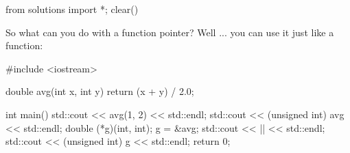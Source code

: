 \begin{python0}
from solutions import *; clear()
\end{python0}

So what can you do with a function pointer? Well ... you can use it
just like a function:

\begin{consolethree}[escapeinside=||]
#include <iostream>

double avg(int x, int y)
{
    return (x + y) / 2.0;
}

int main()
{
    std::cout << avg(1, 2) << std::endl;
    std::cout << (unsigned int) avg << std::endl;
    double (*g)(int, int);
    g = &avg;
    std::cout << || << std::endl;
    std::cout << (unsigned int) g << std::endl;
    return 0;
}
\end{consolethree}




